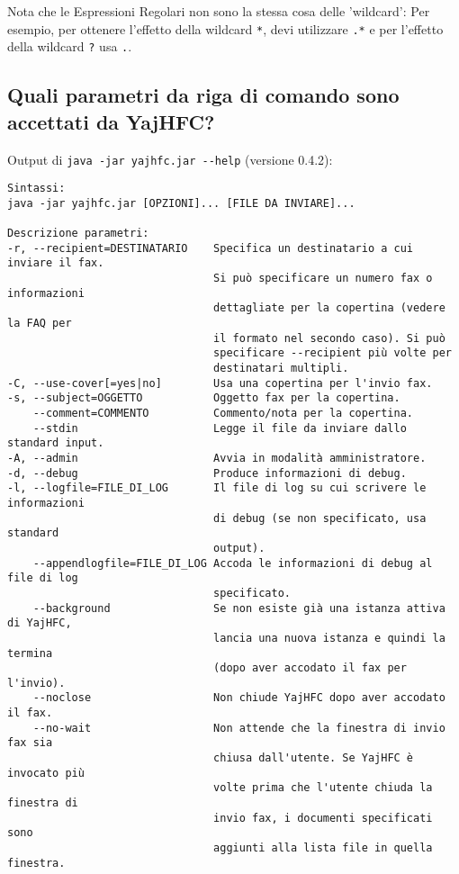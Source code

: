 \documentclass[a4paper,10pt]{scrartcl}
\begin{document}
Nota che le Espressioni Regolari non sono la stessa cosa delle 'wildcard': 
Per esempio, per ottenere l'effetto della wildcard \verb.*., devi utilizzare \verb#.*# e 
per l'effetto della wildcard \verb#?# usa \verb#.#.

\subsection{Quali parametri da riga di comando sono accettati da YajHFC?}

Output di \verb#java -jar yajhfc.jar --help# (versione 0.4.2):
\begin{verbatim}
Sintassi:
java -jar yajhfc.jar [OPZIONI]... [FILE DA INVIARE]...

Descrizione parametri:
-r, --recipient=DESTINATARIO    Specifica un destinatario a cui inviare il fax.
                                Si può specificare un numero fax o informazioni
                                dettagliate per la copertina (vedere la FAQ per
                                il formato nel secondo caso). Si può 
                                specificare --recipient più volte per 
                                destinatari multipli. 
-C, --use-cover[=yes|no]        Usa una copertina per l'invio fax. 
-s, --subject=OGGETTO           Oggetto fax per la copertina. 
    --comment=COMMENTO          Commento/nota per la copertina. 
    --stdin                     Legge il file da inviare dallo standard input. 
-A, --admin                     Avvia in modalità amministratore. 
-d, --debug                     Produce informazioni di debug. 
-l, --logfile=FILE_DI_LOG       Il file di log su cui scrivere le informazioni 
                                di debug (se non specificato, usa standard 
                                output). 
    --appendlogfile=FILE_DI_LOG Accoda le informazioni di debug al file di log 
                                specificato. 
    --background                Se non esiste già una istanza attiva di YajHFC,
                                lancia una nuova istanza e quindi la termina 
                                (dopo aver accodato il fax per l'invio). 
    --noclose                   Non chiude YajHFC dopo aver accodato il fax. 
    --no-wait                   Non attende che la finestra di invio fax sia 
                                chiusa dall'utente. Se YajHFC è invocato più 
                                volte prima che l'utente chiuda la finestra di 
                                invio fax, i documenti specificati sono 
                                aggiunti alla lista file in quella finestra. 

\end{verbatim}
\end{document}
